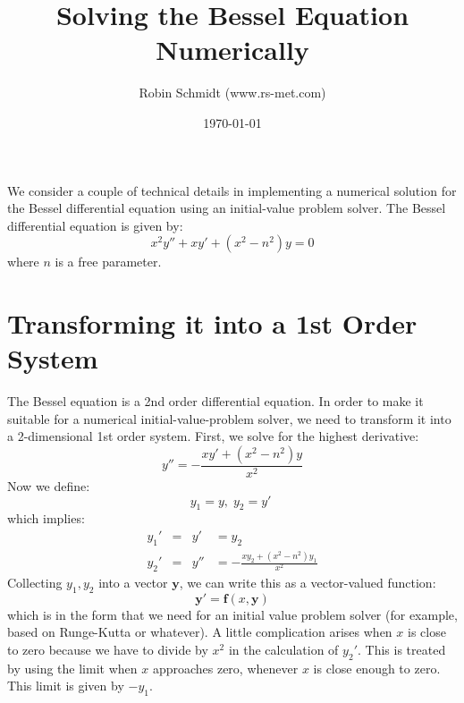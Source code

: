 \title{Solving the Bessel Equation Numerically}
\author{Robin Schmidt (www.rs-met.com)}
\date{\today}
\maketitle

We consider a couple of technical details in implementing a numerical solution for the Bessel differential equation using an initial-value problem solver. The Bessel differential equation is given by:
\begin{equation}
 x^2 y'' + x y' + (x^2 - n^2)y = 0
\end{equation}
where $n$ is a free parameter.


\section{Transforming it into a 1st Order System}
The Bessel equation is a 2nd order differential equation. In order to make it suitable for a numerical initial-value-problem solver, we need to transform it into a 2-dimensional 1st order system. First, we solve for the highest derivative:
\begin{equation}
 y'' = - \frac{x y' + (x^2 - n^2) y}{x^2}
\end{equation}
Now we define:
\begin{equation}
 y_1 = y, \; y_2 = y' \; 
\end{equation}
which implies:
\begin{equation}
 \begin{aligned}
 y_1' &= &y'  &= y_2 \\
 y_2' &= &y'' &= - \frac{x y_2 + (x^2 - n^2) y_1}{x^2}
 \end{aligned}
\end{equation}
Collecting $y_1, y_2$ into a vector $\mathbf{y}$, we can write this as a vector-valued function:
\begin{equation}
 \mathbf{y}' =\mathbf{f}(x, \mathbf{y}) 
\end{equation}
which is in the form that we need for an initial value problem solver (for example, based on Runge-Kutta or whatever). A little complication arises when $x$ is close to zero because we have to divide by $x^2$ in the calculation of $y_2'$. This is treated by using the limit when $x$ approaches zero, whenever $x$ is close enough to zero. This limit is given by $-y_1$.








